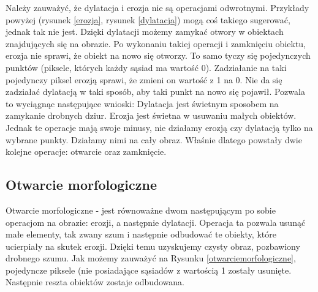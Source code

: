 \documentclass{article}
\begin{document}
        {
            \Large
            \justifying
            \quad
            Należy zauważyć, że dylatacja i erozja nie są operacjami odwrotnymi.
            Przykłady powyżej (rysunek \ref{erozja}, rysunek \ref{dylatacja}) mogą coś takiego sugerować, jednak tak nie jest.
            Dzięki dylatacji możemy zamykać otwory w obiektach znajdujących się na obrazie.
            Po wykonaniu takiej operacji i zamknięciu obiektu, erozja nie sprawi, że obiekt na nowo się otworzy.
            To samo tyczy się pojedynczych punktów (piksele, których każdy sąsiad ma wartość 0).
            Zadziałanie na taki pojedynczy piksel erozją sprawi, że zmieni on wartość z 1 na 0.
            Nie da się zadziałać dylatacją w taki sposób, aby taki punkt na nowo się pojawił.
            Pozwala to wyciągnąc następujące wnioski:
            Dylatacja jest świetnym sposobem na zamykanie drobnych dziur.
            Erozja jest świetna w usuwaniu małych obiektów.
            Jednak te operacje mają swoje minusy, nie działamy erozją czy dylatacją tylko na wybrane punkty.
            Działamy nimi na cały obraz.
            Właśnie dlatego powstały dwie kolejne operacje: otwarcie oraz zamknięcie.
        }

        \newpage
        \subsection{Otwarcie morfologiczne}
        {
            \label{sec:otwarcie-morfologiczne}
            \Large
            \justifying
            \quad
            Otwarcie morfologiczne - jest równoważne dwom następującym po sobie operacjom na obrazie: erozji, a następnie dylatacji.
            Operacja ta pozwala usunąć małe elementy, tak zwany szum i następnie odbudować te obiekty, które ucierpiały na skutek erozji.
            Dzięki temu uzyskujemy czysty obraz, pozbawiony drobnego szumu.
            Jak możemy zauważyć na Rysunku \ref{otwarciemorfologiczne}, pojedyncze piksele (nie posiadające sąsiadów z wartością 1 zostały usunięte.
            Następnie reszta obiektów zostaje odbudowana.
        }
\end{document}
